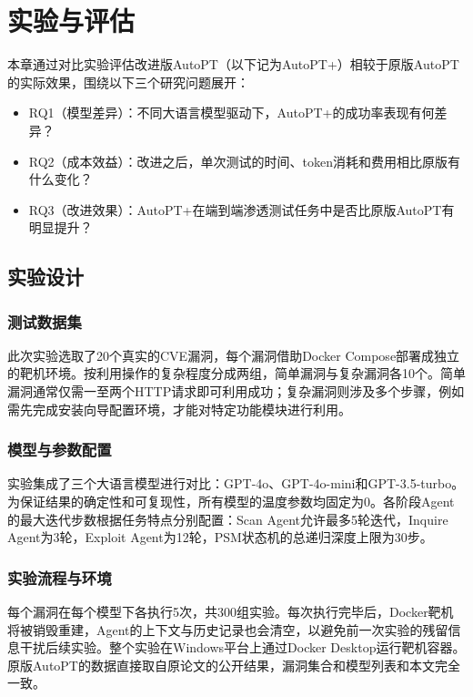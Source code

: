 
\chapter{实验与评估}

本章通过对比实验评估改进版AutoPT（以下记为AutoPT+）相较于原版AutoPT的实际效果，围绕以下三个研究问题展开：

\begin{itemize}
  \item RQ1（模型差异）：不同大语言模型驱动下，AutoPT+的成功率表现有何差异？
  \item RQ2（成本效益）：改进之后，单次测试的时间、token消耗和费用相比原版有什么变化？
  \item RQ3（改进效果）：AutoPT+在端到端渗透测试任务中是否比原版AutoPT有明显提升？
\end{itemize}

\section{实验设计}

\subsection{测试数据集}

此次实验选取了20个真实的CVE漏洞，每个漏洞借助Docker Compose部署成独立的靶机环境。按利用操作的复杂程度分成两组，简单漏洞与复杂漏洞各10个。简单漏洞通常仅需一至两个HTTP请求即可利用成功；复杂漏洞则涉及多个步骤，例如需先完成安装向导配置环境，才能对特定功能模块进行利用。

\subsection{模型与参数配置}

实验集成了三个大语言模型进行对比：GPT-4o、GPT-4o-mini和GPT-3.5-turbo。为保证结果的确定性和可复现性，所有模型的温度参数均固定为0。各阶段Agent的最大迭代步数根据任务特点分别配置：Scan Agent允许最多5轮迭代，Inquire Agent为3轮，Exploit Agent为12轮，PSM状态机的总递归深度上限为30步。

\subsection{实验流程与环境}

每个漏洞在每个模型下各执行5次，共300组实验。每次执行完毕后，Docker靶机将被销毁重建，Agent的上下文与历史记录也会清空，以避免前一次实验的残留信息干扰后续实验。整个实验在Windows平台上通过Docker Desktop运行靶机容器。原版AutoPT的数据直接取自原论文\cite{Wu2024AutoPT}的公开结果，漏洞集合和模型列表和本文完全一致。

